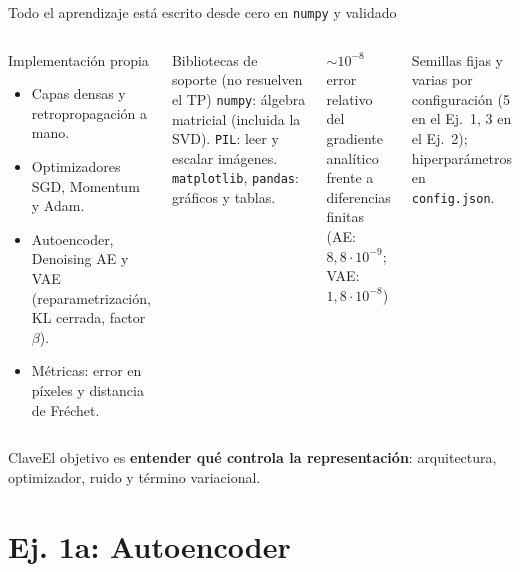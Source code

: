 \documentclass[aspectratio=169]{beamer}
\newcommand{\bignum}[3][itbaBlue]{%
  \begin{minipage}[t]{\linewidth}\centering
    {\fontsize{28}{30}\selectfont\bfseries\color{#1}#2}\\[0.25em]
    {\footnotesize #3}
  \end{minipage}}
\newcommand{\clave}[1]{%
  \vfill
  \begin{alertblock}{Clave}\footnotesize #1\end{alertblock}}
\begin{document}
\begin{frame}{Todo el aprendizaje est\'a escrito desde cero en \texttt{numpy} y validado}
  \begin{columns}[T,onlytextwidth]
      \begin{block}{Implementaci\'on propia}
        \footnotesize
        \begin{itemize}
          \item Capas densas y retropropagaci\'on a mano.
          \item Optimizadores SGD, Momentum y Adam.
          \item Autoencoder, Denoising AE y VAE (reparametrizaci\'on, KL cerrada, factor $\beta$).
          \item M\'etricas: error en p\'ixeles y distancia de Fr\'echet.
        \end{itemize}
      \end{block}
      \begin{block}{Bibliotecas de soporte (no resuelven el TP)}
        \footnotesize
        \texttt{numpy}: \'algebra matricial (incluida la SVD). \texttt{PIL}: leer y escalar im\'agenes. \texttt{matplotlib}, \texttt{pandas}: gr\'aficos y tablas.
      \end{block}
      \bignum{$\sim\!10^{-8}$}{error relativo del gradiente anal\'itico frente a diferencias finitas \\ (AE: $8{,}8\cdot10^{-9}$; VAE: $1{,}8\cdot10^{-8}$)}


      \vspace{0.3cm}
      {\footnotesize Semillas fijas y varias por configuraci\'on (5 en el Ej.\ 1, 3 en el Ej.\ 2); hiperpar\'ametros en \texttt{config.json}.}
  \end{columns}
  \clave{El objetivo es \textbf{entender qu\'e controla la representaci\'on}: arquitectura, optimizador, ruido y t\'ermino variacional.}
\end{frame}

\section{Ej. 1a: Autoencoder}
\end{document}
